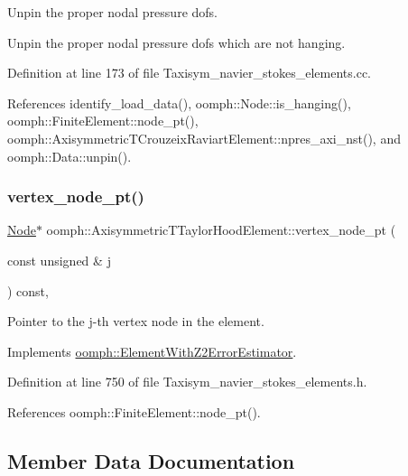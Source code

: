 Unpin the proper nodal pressure dofs. 

Unpin the proper nodal pressure dofs which are not hanging. 

Definition at line 173 of file Taxisym\+\_\+navier\+\_\+stokes\+\_\+elements.\+cc.



References identify\+\_\+load\+\_\+data(), oomph\+::\+Node\+::is\+\_\+hanging(), oomph\+::\+Finite\+Element\+::node\+\_\+pt(), oomph\+::\+Axisymmetric\+T\+Crouzeix\+Raviart\+Element\+::npres\+\_\+axi\+\_\+nst(), and oomph\+::\+Data\+::unpin().

\mbox{\label{classoomph_1_1AxisymmetricTTaylorHoodElement_a44d3195ac5946d8ea71ea5fe98120605}} 
\subsubsection{\texorpdfstring{vertex\+\_\+node\+\_\+pt()}{vertex\_node\_pt()}}
{\footnotesize\ttfamily \hyperlink{classoomph_1_1Node}{Node}$\ast$ oomph\+::\+Axisymmetric\+T\+Taylor\+Hood\+Element\+::vertex\+\_\+node\+\_\+pt (\begin{DoxyParamCaption}\item[{const unsigned \&}]{j }\end{DoxyParamCaption}) const\hspace{0.3cm}{\ttfamily [inline]}, {\ttfamily [virtual]}}



Pointer to the j-\/th vertex node in the element. 



Implements \hyperlink{classoomph_1_1ElementWithZ2ErrorEstimator_a0eedccc33519f852c5dc2055ddf2774b}{oomph\+::\+Element\+With\+Z2\+Error\+Estimator}.



Definition at line 750 of file Taxisym\+\_\+navier\+\_\+stokes\+\_\+elements.\+h.



References oomph\+::\+Finite\+Element\+::node\+\_\+pt().



\subsection{Member Data Documentation}
\mbox{\label{classoomph_1_1AxisymmetricTTaylorHoodElement_aa99c5de016b430db779ef2fc830a7f9a}} 
